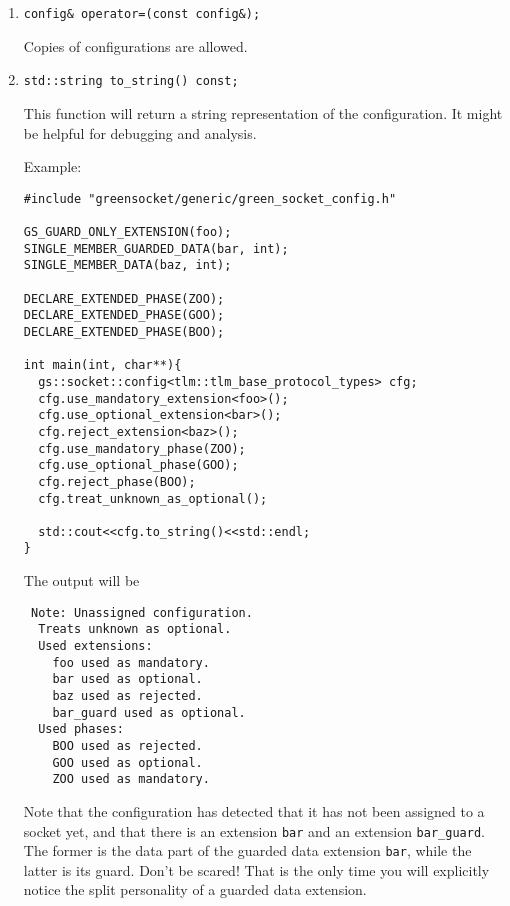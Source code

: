\documentclass[a4paper,10pt]{article}          %
\begin{document}
\begin{enumerate}
\item 
\verb|config& operator=(const config&);|

Copies of configurations are allowed.

\item
\verb|std::string to_string() const;|

This function will return a string representation of the configuration. It might be helpful for debugging and analysis.

Example:

\begin{small}
\begin{verbatim}
#include "greensocket/generic/green_socket_config.h"

GS_GUARD_ONLY_EXTENSION(foo);
SINGLE_MEMBER_GUARDED_DATA(bar, int);
SINGLE_MEMBER_DATA(baz, int);

DECLARE_EXTENDED_PHASE(ZOO);
DECLARE_EXTENDED_PHASE(GOO);
DECLARE_EXTENDED_PHASE(BOO);

int main(int, char**){
  gs::socket::config<tlm::tlm_base_protocol_types> cfg;
  cfg.use_mandatory_extension<foo>(); 
  cfg.use_optional_extension<bar>();
  cfg.reject_extension<baz>();
  cfg.use_mandatory_phase(ZOO);
  cfg.use_optional_phase(GOO);
  cfg.reject_phase(BOO);
  cfg.treat_unknown_as_optional();
   
  std::cout<<cfg.to_string()<<std::endl;
}
\end{verbatim}
\end{small}

The output will be

\begin{small}
\begin{verbatim}
 Note: Unassigned configuration.
  Treats unknown as optional.
  Used extensions:
    foo used as mandatory.
    bar used as optional.
    baz used as rejected.
    bar_guard used as optional.
  Used phases:
    BOO used as rejected.
    GOO used as optional.
    ZOO used as mandatory.
\end{verbatim}
\end{small}

Note that the configuration has detected that it has not been assigned to a socket yet, and that there is an extension \verb|bar| and an extension \verb|bar_guard|. The former is the data part of the guarded data extension \verb|bar|, while the latter is its guard. Don't be scared! That is the only time you will explicitly notice the split personality of a guarded data extension. 
\end{enumerate}
\end{document}
